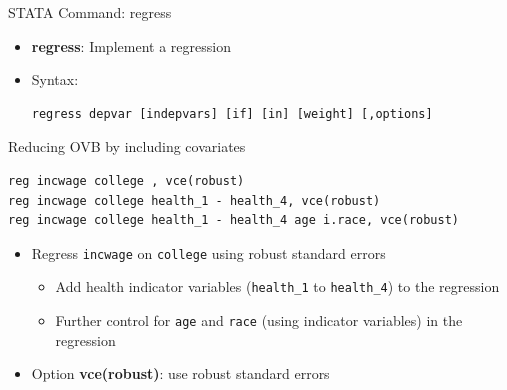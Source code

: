 \documentclass[dvipsnames,hyperref={pdfpagelabels=false}]{beamer}
\begin{document}
\begin{frame}[fragile]{STATA Command: regress}
\begin{itemize}
\item  \textbf{regress}: Implement a regression
\vspace{0.2cm}
\item Syntax:
\vspace{0.2cm}
\begin{lstlisting}
regress depvar [indepvars] [if] [in] [weight] [,options]
\end{lstlisting}


\end{itemize}
\end{frame}




\begin{frame}[fragile]{Reducing OVB by including covariates}
	
		
\begin{lstlisting}
reg incwage college , vce(robust)
reg incwage college health_1 - health_4, vce(robust)  
reg incwage college health_1 - health_4 age i.race, vce(robust)
\end{lstlisting}
		
		\vspace{0.2cm}
		
	\begin{itemize}
		\item Regress \texttt{incwage} on \texttt{college} using robust standard errors
		
		\vspace{0.2cm}
			\begin{itemize}
		\item Add health indicator variables (\texttt{health\_1} to \texttt{health\_4}) to the regression 
		
		\vspace{0.2cm}  
		
		\item Further control for \texttt{age} and \texttt{race} (using indicator variables) in the regression
		
		\vspace{0.2cm}
			\end{itemize}
		\item Option \textbf{vce(robust)}: use robust standard errors
		
	\end{itemize}
	
\end{frame}
\end{document}
